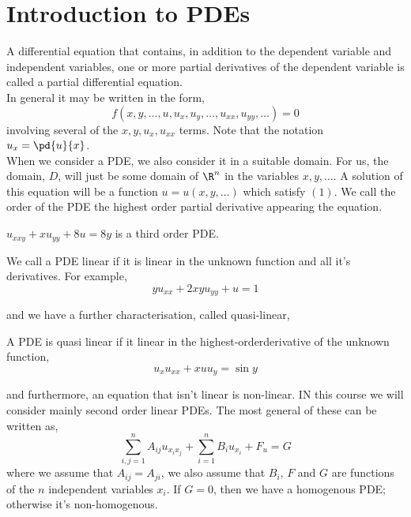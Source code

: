 
\section{Introduction to PDEs}
A differential equation that contains, in addition to the dependent variable and independent variables, one or more partial derivatives of the dependent variable is called a partial differential equation.\\

\noindent
In general it may be written in the form,
\begin{equation}
  f(x, y, \dots, u, u_x, u_y, \dots, u_{xx}, u_{yy}, \dots) = 0
\end{equation}
involving several of the $x, y, u_{x}, u_{xx}$ terms. Note that the notation $u_x = \pd{u}{x}$.\\

\noindent
When we consider a PDE, we also consider it in a suitable domain. For us, the domain, $D$, will just be some domain of $\R^n$ in the variables $x, y, \dots$. A solution of this equation will be a function $u = u(x, y, \dots)$ which satisfy $(1)$. We call the order of the PDE the highest order partial derivative appearing the equation.
\begin{eg}
  $u_{xxy} + xu_{yy} + 8u = 8y$ is a third order PDE.
\end{eg}

\begin{ndefi}[Linear]
  We call a PDE linear if it is linear in the unknown function and all it's derivatives. For example,
  $$ yu_{xx} + 2xyu_{yy} + u = 1 $$
\end{ndefi}

and we have a further characterisation, called quasi-linear,

\begin{ndefi}
  A PDE is quasi linear if it linear in the highest-orderderivative of the unknown function,
  $$ u_xu_{xx} + xuu_y = \sin y $$
\end{ndefi}

and furthermore, an equation that isn't linear is non-linear. IN this course we will consider mainly second order linear PDEs. The most general of these can be written as,
$$ \sum_{i, j = 1}^n A_{ij}u_{x_ix_j} + \sum_{i=1}^n B_iu_{x_i} + F_u = G $$
where we assume that $A_{ij} = A_{ji}$, we also assume that $B_i$, $F$ and $G$ are functions of the $n$ independent variables $x_i$. If $G = 0$, then we have a homogenous PDE; otherwise it's non-homogenous.\\

